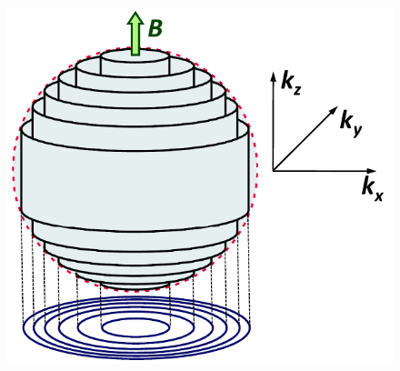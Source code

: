 \documentclass[10pt]{report}
\numberwithin{equation}{chapter}
\begin{document}
\begin{figure}[t]
  \begin{minipage}[c][8.00cm]{.60\textwidth}
    \centering
    \includegraphics[width=0.90\linewidth]{../img/QO_landau_zylinder.png}
    \captionsetup{width=.85\linewidth}
  \end{minipage}%
  \begin{minipage}[c][8.00cm]{.40\textwidth}
    \centering

\end{minipage}
\end{figure}
\end{document}
